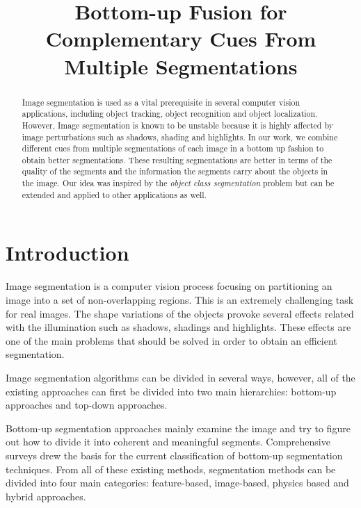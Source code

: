 \documentclass{llncs}
\begin{document}
\title{Bottom-up Fusion for Complementary Cues From Multiple Segmentations}



\maketitle

\begin{abstract}

Image segmentation is used as a vital prerequisite in several computer vision applications, including object
tracking, object recognition and object localization.
However, Image segmentation is known to be unstable because it is highly affected by image perturbations
such as shadows, shading and highlights.
In our work, we combine different cues from multiple segmentations of each image in a
bottom up fashion to obtain better segmentations.
These resulting segmentations are better in terms of the quality of the segments and the information
the segments carry about the objects in the image. Our idea was inspired by the \textit{object class
segmentation} problem but can be extended and applied to other applications as well.

\end{abstract}

\section{Introduction}

Image segmentation is a computer vision process focusing on
partitioning an image into a set of non-overlapping regions. This is
an extremely challenging task for real images. The shape variations of
the objects provoke several effects related with the illumination such
as shadows, shadings and highlights. These effects are one of the main
problems that should be solved in order to obtain an efficient
segmentation.

Image segmentation algorithms can be divided in several ways, however,
all of the existing approaches can first be divided into two main
hierarchies: bottom-up approaches and top-down approaches.

Bottom-up segmentation approaches mainly examine the image and try to figure out how to divide it into coherent
and meaningful segments. Comprehensive surveys \cite{Cheng01colorimage} drew the basis for the
current classification of bottom-up segmentation techniques. From all of these existing methods, segmentation
methods can be divided into four main categories: feature-based, image-based, physics based and hybrid approaches.
\end{document}
